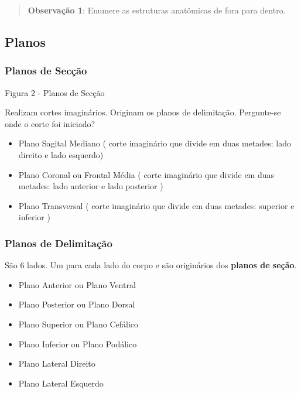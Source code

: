 \documentclass[
]{book}
\providecommand{\tightlist}{%
  \setlength{\itemsep}{0pt}\setlength{\parskip}{0pt}}
\begin{document}
\begin{quote}
\textbf{Observação 1}: Enumere as estruturas anatômicas de fora para dentro.
\end{quote}

\hypertarget{planos}{%
\subsection{Planos}\label{planos}}

\hypertarget{planos-de-secuxe7uxe3o}{%
\subsubsection*{Planos de Secção}\label{planos-de-secuxe7uxe3o}}

Figura 2 - Planos de Secção

Realizam cortes imaginários. Originam os planos de delimitação. Pergunte-se onde o corte foi iniciado?

\begin{itemize}
\tightlist
\item
  Plano Sagital Mediano ( corte imaginário que divide em duas metades: lado direito e lado esquerdo)
\item
  Plano Coronal ou Frontal Média ( corte imaginário que divide em duas metades: lado anterior e lado posterior )
\item
  Plano Transversal ( corte imaginário que divide em duas metades: superior e inferior )
\end{itemize}

\hypertarget{planos-de-delimitauxe7uxe3o}{%
\subsubsection*{Planos de Delimitação}\label{planos-de-delimitauxe7uxe3o}}

São 6 lados. Um para cada lado do corpo e são originários dos \textbf{planos de seção}.

\begin{itemize}
\tightlist
\item
  Plano Anterior ou Plano Ventral
\item
  Plano Posterior ou Plano Dorsal
\item
  Plano Superior ou Plano Cefálico
\item
  Plano Inferior ou Plano Podálico
\item
  Plano Lateral Direito
\item
  Plano Lateral Esquerdo
\end{itemize}
\end{document}
